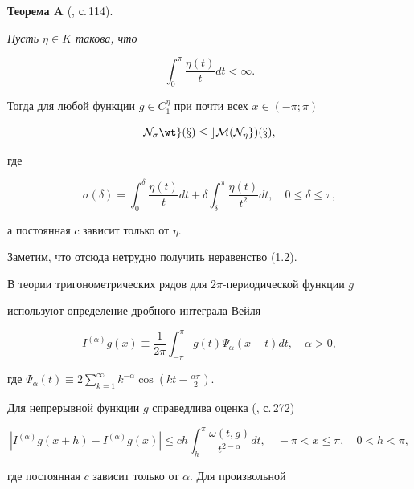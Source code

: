{\bf Теорема A} (\cite{kor}, с.\,114). {\it Пусть $\eta\in K$ такова, что


$$


\int_0^\pi\frac{\eta(t)}{t}dt<\infty.


$$


Тогда для любой функции $g\in C^\eta_1$ при почти всех $x\in (-\pi;\pi)$


\begin{equation}


\N_\sigma\wt g(x)\le cM(\N_\eta g)(x),


\end{equation}


где


$$


\sigma(\delta)=\int_0^\delta\frac{\eta(t)}{t}dt+\delta\int_\delta^\pi


\frac{\eta(t)}{t^2}dt,\quad 0\le\delta\le\pi,


$$


а постоянная $c$ зависит только от $\eta$.}


\medskip





Заметим, что отсюда нетрудно получить неравенство (1.2).





В теории тригонометрических рядов для $2\pi$-периодической функции $g$


используют определение дробного интеграла Вейля \cite{vey}


$$


I^{(\alpha)}g(x)\equiv\frac{1}{2\pi}\int_{-\pi}^\pi g(t)\Psi_\alpha(x-t)


dt,\quad \alpha>0,


$$


где $\Psi_\alpha(t)\equiv 2\sum\limits_{k=1}^\infty k^{-\alpha}\cos(kt-


\frac{\alpha\pi}{2})$.


Для непрерывной функции $g$ справедлива оценка (\cite{sam}, с.\,272)


\begin{equation}


|I^{(\alpha)}g(x+h)-I^{(\alpha)}g(x)|\le ch\int_h^\pi\frac{\omega(t,g)}


{t^{2-\alpha}}dt,\quad -\pi<x\le\pi, \quad 0<h<\pi, 


\end{equation}


где постоянная $c$ зависит только от $\alpha$. Для произвольной


